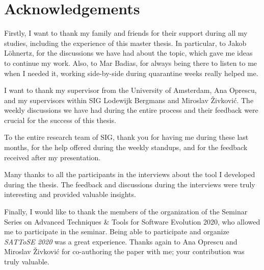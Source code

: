 \chapter*{Acknowledgements}
Firstly, I want to thank my family and friends for their support during all my studies, including the experience of this master thesis. In particular, to Jakob Löhnertz, for the discussions we have had about the topic, which gave me ideas to continue my work. Also, to Mar Badias, for always being there to listen to me when I needed it, working side-by-side during quarantine weeks really helped me.

I want to thank my supervisor from the University of Amsterdam, Ana Oprescu, and my supervisors within SIG Lodewijk Bergmans and Miroslav \v{Z}ivkovi\'{c}. The weekly discussions we have had during the entire process and their feedback were crucial for the success of this thesis.

To the entire research team of SIG, thank you for having me during these last months, for the help offered during the weekly standups, and for the feedback received after my presentation.

Many thanks to all the participants in the interviews about the tool I developed during the thesis. The feedback and discussions during the interviews were truly interesting and provided valuable insights.

Finally, I would like to thank the members of the organization of the Seminar Series on Advanced Techniques \& Tools for Software Evolution 2020, who allowed me to participate in the seminar. Being able to participate and organize \textit{SATToSE 2020} was a great experience. Thanks again to Ana Oprescu and Miroslav \v{Z}ivkovi\'{c} for co-authoring the paper with me; your contribution was truly valuable.
